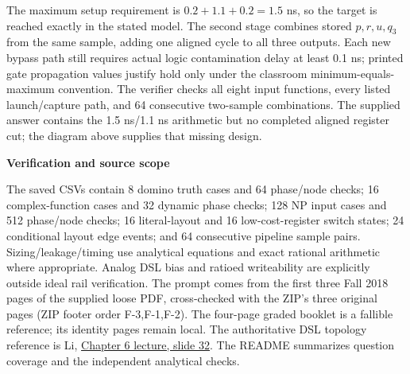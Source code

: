 \documentclass[10pt]{article}
\newcommand{\qheading}[1]{\par\medskip\textbf{#1}\par}
\begin{document}
The maximum setup requirement is $0.2+1.1+0.2=1.5$ ns, so the target is reached exactly in the stated model. The second stage combines stored $p,r,u,q_3$ from the same sample, adding one aligned cycle to all three outputs. Each new bypass path still requires actual logic contamination delay at least 0.1 ns; printed gate propagation values justify hold only under the classroom minimum-equals-maximum convention.
The verifier checks all eight input functions, every listed launch/capture path, and 64 consecutive two-sample combinations. The supplied answer contains the 1.5 ns/1.1 ns arithmetic but no completed aligned register cut; the diagram above supplies that missing design.
\qheading{Verification and source scope}
The saved CSVs contain 8 domino truth cases and 64 phase/node checks; 16 complex-function cases and 32 dynamic phase checks; 128 NP input cases and 512 phase/node checks; 16 literal-layout and 16 low-cost-register switch states; 24 conditional layout edge events; and 64 consecutive pipeline sample pairs. Sizing/leakage/timing use analytical equations and exact rational arithmetic where appropriate. Analog DSL bias and ratioed writeability are explicitly outside ideal rail verification.
The prompt comes from the first three Fall 2018 pages of the supplied loose PDF, cross-checked with the ZIP's three original pages (ZIP footer order F-3,F-1,F-2). The four-page graded booklet is a fallible reference; its identity pages remain local. The authoritative DSL topology reference is Li, \href{https://www.ee.ncu.edu.tw/jfli/public_html/VLSI/lecture/ch06.pdf}{Chapter 6 lecture, slide 32}. The README summarizes question coverage and the independent analytical checks.
\end{document}
